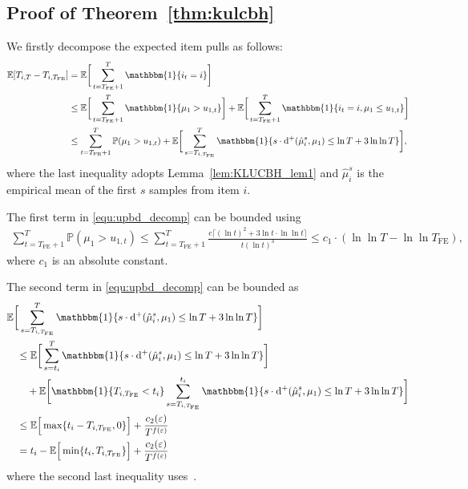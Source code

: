 \documentclass[twoside,11pt]{article}
\newcommand{\rmd}{\mathrm{d}}
\newcommand{\bbE}{\mathbb{E}}
\newcommand{\bbP}{\mathbb{P}}
\newcommand{\Tfe}{T_{\mathrm{FE}}}
\newcommand{\hatmu}{\hat{\mu}}
\begin{document}
\subsection{Proof of Theorem~\ref{thm:kulcbh}}\label{app:proof_klucbh}

We firstly decompose the expected item pulls as follows:
\begin{align}    \label{equ:upbd_decomp}
    \bbE[T_{i,T}-T_{i,\Tfe}]
    &=\bbE\bigg[ \sum_{t=\Tfe+1}^T\mathbbm{1}\{i_t=i\}\bigg]
    \\
    &\leq \bbE\bigg[ \sum_{t=\Tfe+1}^T\mathbbm{1}\{\mu_1>u_{1,t}\}\bigg]
    +\bbE\bigg[ \sum_{t=\Tfe+1}^T\mathbbm{1}\{i_t=i,\mu_1\leq u_{1,t}\}\bigg]
    \\*
    &\leq
    \sum_{t=\Tfe+1}^T \bbP( \mu_1>u_{1,t})
    +\bbE\bigg[ \sum_{s=T_{i,\Tfe}}^T \mathbbm{1}\{s\cdot \rmd^+(\hatmu_i^s,\mu_1)\leq \ln T+3 \ln\ln T\}\bigg],
\end{align}
where the last inequality adopts Lemma~\ref{lem:KLUCBH_lem1} and $\hatmu_i^s$ is the empirical mean of the first $s$ samples from item $i$.

The first term in \eqref{equ:upbd_decomp} can be bounded using~\citet[Theorem 10]{garivier2011KLUCB}
\begin{align}
    \sum_{t=\Tfe+1}^T \bbP( \mu_1>u_{1,t})
    \leq 
    \sum_{t=\Tfe+1}^T \frac{e\lceil(\ln t)^2 + 3 \ln t\cdot \ln\ln t\rceil}{t (\ln t)^3}
    \leq
    c_1 \cdot ( \ln\ln T -  \ln\ln \Tfe),
\end{align}
where $c_1$ is an absolute constant.


The second term in \eqref{equ:upbd_decomp} can be bounded as
\begin{align}
    &\bbE\bigg[ \sum_{s=T_{i,\Tfe}}^T \mathbbm{1}\{s\cdot \rmd^+(\hatmu_i^s,\mu_1)\leq \ln T+3 \ln\ln T\}\bigg]
    \\
    &\quad\leq
    \bbE\bigg[ \sum_{s=t_i}^T \mathbbm{1}\{s\cdot \rmd^+(\hatmu_i^s,\mu_1)\leq \ln T+3 \ln\ln T\}\bigg]
    \\
    &\qquad+\bbE\bigg[\mathbbm{1}\{T_{i,\Tfe}<t_i\} \sum_{s=T_{i,\Tfe}}^{t_i} \mathbbm{1}\{s\cdot \rmd^+(\hatmu_i^s,\mu_1)\leq \ln T+3 \ln\ln T\}\bigg]
    \\
    &\quad\leq
    \bbE\Big[\max\{t_i-T_{i,\Tfe},0\} \Big] + \frac{c_2(\varepsilon)}{T^{f(\varepsilon)}}
    \\
    &\quad=t_i-
    \bbE\Big[\min\{t_i,T_{i,\Tfe}\} \Big] + \frac{c_2(\varepsilon)}{T^{f(\varepsilon)}}
\end{align}
where the second last inequality uses~\citet[Lemma 8]{garivier2011KLUCB}.
\end{document}
